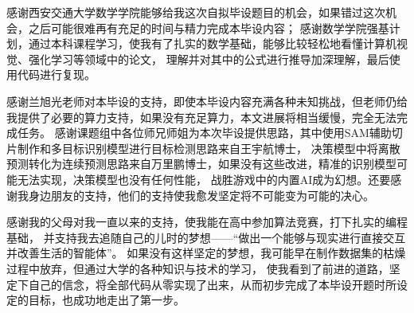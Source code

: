 

感谢西安交通大学数学学院能够给我这次自拟毕设题目的机会，如果错过这次机会，之后可能很难再有充足的时间与精力完成本毕设内容；
感谢数学学院强基计划，通过本科课程学习，使我有了扎实的数学基础，能够比较轻松地看懂计算机视觉、强化学习等领域中的论文，
理解并对其中的公式进行推导加深理解，最后使用代码进行复现。

感谢兰旭光老师对本毕设的支持，即使本毕设内容充满各种未知挑战，但老师仍给我提供了必要的算力支持，如果没有充足算力，本文进展将相当缓慢，完全无法完成任务。
感谢课题组中各位师兄师姐为本次毕设提供思路，其中使用SAM辅助切片制作和多目标识别模型进行目标检测思路来自王宇航博士，
决策模型中将离散预测转化为连续预测思路来自万里鹏博士，如果没有这些改进，精准的识别模型可能无法实现，决策模型也没有任何性能，
战胜游戏中的内置AI成为幻想。还要感谢我身边朋友的支持，他们的支持使我愈发坚定将不可能变为可能的决心。

感谢我的父母对我一直以来的支持，使我能在高中参加算法竞赛，打下扎实的编程基础，
并支持我去追随自己的儿时的梦想——“做出一个能够与现实进行直接交互并改善生活的智能体”。
如果没有这样坚定的梦想，我可能早在制作数据集的枯燥过程中放弃，但通过大学的各种知识与技术的学习，
使我看到了前进的道路，坚定下自己的信念，将全部代码从零实现了出来，从而初步完成了本毕设开题时所设定的目标，也成功地走出了第一步。
